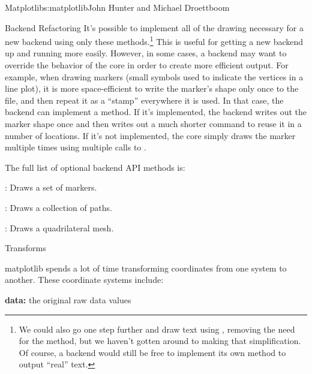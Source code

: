 \begin{aosachapter}{Matplotlib}{s:matplotlib}{John Hunter and Michael Droettboom}
\begin{aosasect1}{Backend Refactoring}
It's possible to implement all of the drawing necessary for a new
backend using only these methods.\footnote{We could also go one step
  further and draw text using , removing the
  need for the  method, but we haven't gotten
  around to making that simplification.  Of course, a backend would
  still be free to implement its own  method to
  output ``real'' text.}  This is useful for getting a new backend
up and running more easily.  However, in some cases, a backend may
want to override the behavior of the core in order to create more
efficient output.  For example, when drawing markers (small symbols
used to indicate the vertices in a line plot), it is more
space-efficient to write the marker's shape only once to the file, and
then repeat it as a ``stamp'' everywhere it is used.  In that case,
the backend can implement a  method.  If it's
implemented, the backend writes out the marker shape once and then
writes out a much shorter command to reuse it in a number of
locations.  If it's not implemented, the core simply draws the marker
multiple times using multiple calls to .

The full list of optional backend API methods is:

\begin{aosaitemize}

  \item {}: Draws a set of markers.

  \item {}: Draws a collection of paths.

  \item {}: Draws a quadrilateral mesh.

\end{aosaitemize}

\end{aosasect1}

\begin{aosasect1}{Transforms}


matplotlib spends a lot of time transforming coordinates from one
system to another.  These coordinate systems include:

\begin{aosaitemize}
\item \textbf{data:} the original raw data values


\end{aosaitemize}
\end{aosasect1}
\end{aosachapter}
